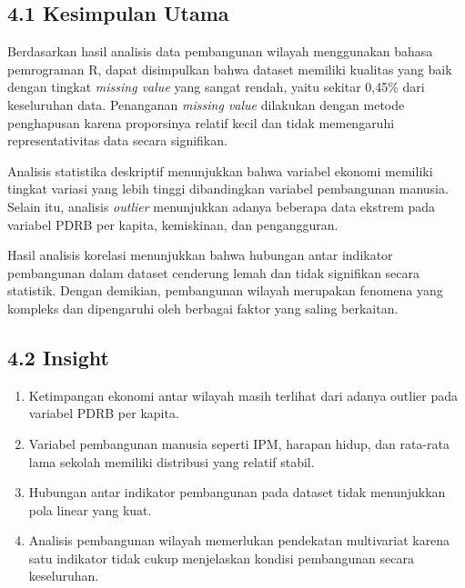 \documentclass[
  12pt,
]{article}
\providecommand{\tightlist}{%
  \setlength{\itemsep}{0pt}\setlength{\parskip}{0pt}}
\begin{document}
\subsection{\texorpdfstring{\normalsize 4.1 \hspace {0,5cm} Kesimpulan
Utama}{4.1  Kesimpulan Utama}}\label{kesimpulan-utama}

\vspace{-0.5cm}

Berdasarkan hasil analisis data pembangunan wilayah menggunakan bahasa
pemrograman R, dapat disimpulkan bahwa dataset memiliki kualitas yang
baik dengan tingkat \emph{missing value} yang sangat rendah, yaitu
sekitar 0,45\% dari keseluruhan data. Penanganan \emph{missing value}
dilakukan dengan metode penghapusan karena proporsinya relatif kecil dan
tidak memengaruhi representativitas data secara signifikan.

Analisis statistika deskriptif menunjukkan bahwa variabel ekonomi
memiliki tingkat variasi yang lebih tinggi dibandingkan variabel
pembangunan manusia. Selain itu, analisis \emph{outlier} menunjukkan
adanya beberapa data ekstrem pada variabel PDRB per kapita, kemiskinan,
dan pengangguran.

Hasil analisis korelasi menunjukkan bahwa hubungan antar indikator
pembangunan dalam dataset cenderung lemah dan tidak signifikan secara
statistik. Dengan demikian, pembangunan wilayah merupakan fenomena yang
kompleks dan dipengaruhi oleh berbagai faktor yang saling berkaitan.

\subsection{\texorpdfstring{\normalsize 4.2 \hspace {0,5cm}
Insight}{4.2  Insight}}\label{insight}

\vspace{-0.5cm}

\begin{enumerate}
\def\labelenumi{\arabic{enumi}.}
\tightlist
\item
  Ketimpangan ekonomi antar wilayah masih terlihat dari adanya outlier
  pada variabel PDRB per kapita.
\item
  Variabel pembangunan manusia seperti IPM, harapan hidup, dan rata-rata
  lama sekolah memiliki distribusi yang relatif stabil.
\item
  Hubungan antar indikator pembangunan pada dataset tidak menunjukkan
  pola linear yang kuat.
\item
  Analisis pembangunan wilayah memerlukan pendekatan multivariat karena
  satu indikator tidak cukup menjelaskan kondisi pembangunan secara
  keseluruhan.
\end{enumerate}
\end{document}
